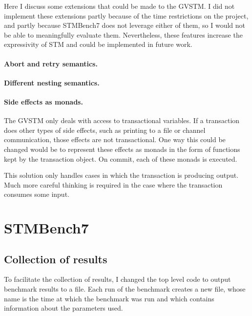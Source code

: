 \documentclass[12pt,a4paper,oneside,openright]{report}
\begin{document}
Here I discuss some extensions that could be made to the GVSTM. I did
not implement these extensions partly because of the time restrictions
on the project, and partly because STMBench7 does not leverage either
of them, so I would not be able to meaningfully evaluate
them. Nevertheless, these features increase the expressivity of STM
and could be implemented in future work.

\paragraph{Abort and retry semantics.}
\label{sec:impl:abort-retry-semant}

\paragraph{Different nesting semantics.}
\label{sec:impl:diff-nest-semant}

\paragraph{Side effects as monads.}
\label{sec:impl:side-effects-as}

The GVSTM only deals with access to transactional variables. If a
transaction does other types of side effects, such as printing to a
file or channel communication, those effects are not
transactional. One way this could be changed would be to represent
these effects as monads in the form of functions kept by the
transaction object. On commit, each of these monads is executed.

This solution only handles cases in which the transaction is producing
output. Much more careful thinking is required in the case where the
transaction consumes some input.

\section{STMBench7}
\label{sec:impl:stmbench7}

\subsection{Collection of results}
\label{sec:impl:collection-results}

To facilitate the collection of results, I changed the top level code
to output benchmark results to a file. Each run of the benchmark
creates a new file, whose name is the time at which the benchmark was
run and which contains information about the parameters used.
\end{document}
